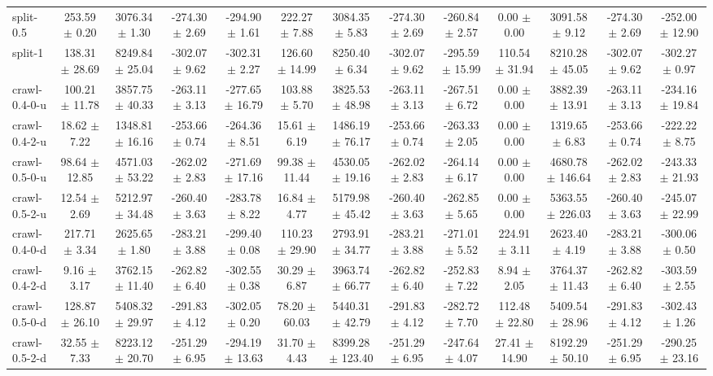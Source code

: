 \begin{tabular}{|lcccccccccccc|}
split-0.5 & 253.59 $\pm$ 0.20 & 3076.34 $\pm$ 1.30 & -274.30 $\pm$ 2.69 & -294.90 $\pm$ 1.61 & 222.27 $\pm$ 7.88 & 3084.35 $\pm$ 5.83 & -274.30 $\pm$ 2.69 & -260.84 $\pm$ 2.57 & 0.00 $\pm$ 0.00 & 3091.58 $\pm$ 9.12 & -274.30 $\pm$ 2.69 & -252.00 $\pm$ 12.90 \\
split-1 & 138.31 $\pm$ 28.69 & 8249.84 $\pm$ 25.04 & -302.07 $\pm$ 9.62 & -302.31 $\pm$ 2.27 & 126.60 $\pm$ 14.99 & 8250.40 $\pm$ 6.34 & -302.07 $\pm$ 9.62 & -295.59 $\pm$ 15.99 & 110.54 $\pm$ 31.94 & 8210.28 $\pm$ 45.05 & -302.07 $\pm$ 9.62 & -302.27 $\pm$ 0.97 \\
crawl-0.4-0-u & 100.21 $\pm$ 11.78 & 3857.75 $\pm$ 40.33 & -263.11 $\pm$ 3.13 & -277.65 $\pm$ 16.79 & 103.88 $\pm$ 5.70 & 3825.53 $\pm$ 48.98 & -263.11 $\pm$ 3.13 & -267.51 $\pm$ 6.72 & 0.00 $\pm$ 0.00 & 3882.39 $\pm$ 13.91 & -263.11 $\pm$ 3.13 & -234.16 $\pm$ 19.84 \\
crawl-0.4-2-u & 18.62 $\pm$ 7.22 & 1348.81 $\pm$ 16.16 & -253.66 $\pm$ 0.74 & -264.36 $\pm$ 8.51 & 15.61 $\pm$ 6.19 & 1486.19 $\pm$ 76.17 & -253.66 $\pm$ 0.74 & -263.33 $\pm$ 2.05 & 0.00 $\pm$ 0.00 & 1319.65 $\pm$ 6.83 & -253.66 $\pm$ 0.74 & -222.22 $\pm$ 8.75 \\
crawl-0.5-0-u & 98.64 $\pm$ 12.85 & 4571.03 $\pm$ 53.22 & -262.02 $\pm$ 2.83 & -271.69 $\pm$ 17.16 & 99.38 $\pm$ 11.44 & 4530.05 $\pm$ 19.16 & -262.02 $\pm$ 2.83 & -264.14 $\pm$ 6.17 & 0.00 $\pm$ 0.00 & 4680.78 $\pm$ 146.64 & -262.02 $\pm$ 2.83 & -243.33 $\pm$ 21.93 \\
crawl-0.5-2-u & 12.54 $\pm$ 2.69 & 5212.97 $\pm$ 34.48 & -260.40 $\pm$ 3.63 & -283.78 $\pm$ 8.22 & 16.84 $\pm$ 4.77 & 5179.98 $\pm$ 45.42 & -260.40 $\pm$ 3.63 & -262.85 $\pm$ 5.65 & 0.00 $\pm$ 0.00 & 5363.55 $\pm$ 226.03 & -260.40 $\pm$ 3.63 & -245.07 $\pm$ 22.99 \\
crawl-0.4-0-d & 217.71 $\pm$ 3.34 & 2625.65 $\pm$ 1.80 & -283.21 $\pm$ 3.88 & -299.40 $\pm$ 0.08 & 110.23 $\pm$ 29.90 & 2793.91 $\pm$ 34.77 & -283.21 $\pm$ 3.88 & -271.01 $\pm$ 5.52 & 224.91 $\pm$ 3.11 & 2623.40 $\pm$ 4.19 & -283.21 $\pm$ 3.88 & -300.06 $\pm$ 0.50 \\
crawl-0.4-2-d & 9.16 $\pm$ 3.17 & 3762.15 $\pm$ 11.40 & -262.82 $\pm$ 6.40 & -302.55 $\pm$ 0.38 & 30.29 $\pm$ 6.87 & 3963.74 $\pm$ 66.77 & -262.82 $\pm$ 6.40 & -252.83 $\pm$ 7.22 & 8.94 $\pm$ 2.05 & 3764.37 $\pm$ 11.43 & -262.82 $\pm$ 6.40 & -303.59 $\pm$ 2.55 \\
crawl-0.5-0-d & 128.87 $\pm$ 26.10 & 5408.32 $\pm$ 29.97 & -291.83 $\pm$ 4.12 & -302.05 $\pm$ 0.20 & 78.20 $\pm$ 60.03 & 5440.31 $\pm$ 42.79 & -291.83 $\pm$ 4.12 & -282.72 $\pm$ 7.70 & 112.48 $\pm$ 22.80 & 5409.54 $\pm$ 28.96 & -291.83 $\pm$ 4.12 & -302.43 $\pm$ 1.26 \\
crawl-0.5-2-d & 32.55 $\pm$ 7.33 & 8223.12 $\pm$ 20.70 & -251.29 $\pm$ 6.95 & -294.19 $\pm$ 13.63 & 31.70 $\pm$ 4.43 & 8399.28 $\pm$ 123.40 & -251.29 $\pm$ 6.95 & -247.64 $\pm$ 4.07 & 27.41 $\pm$ 14.90 & 8192.29 $\pm$ 50.10 & -251.29 $\pm$ 6.95 & -290.25 $\pm$ 23.16 \\
\hline
\end{tabular}
